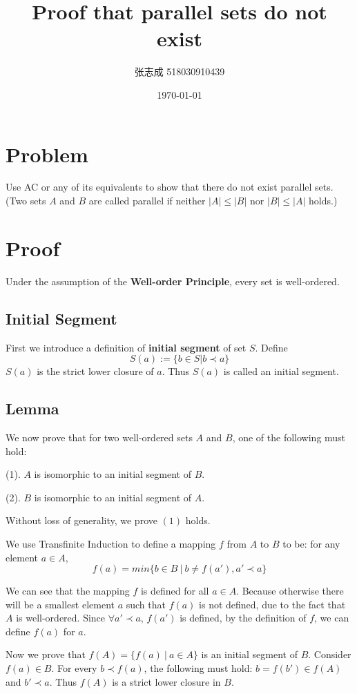 \documentclass[UTF8, 12pt]{ctexart}
\title{Proof that parallel sets do not exist}
\author{张志成 518030910439}
\date{\today}
\begin{document}
    \maketitle

    \section{Problem}
        Use AC or any of its equivalents to show that there do not exist parallel sets.
        (Two sets $A$ and $B$ are called parallel if neither $|A| \leq |B|$ nor $|B| \leq |A|$ holds.)
    \section{Proof}
        Under the assumption of the \textbf{Well-order Principle}, every set is well-ordered.
    \subsection{Initial Segment}
        First we introduce a definition of \textbf{initial segment} of set $S$.
        Define
        $$ S(a) := \{b \in S | b \prec a \} $$ 
        $S(a)$ is the strict lower closure of $a$. Thus $S(a)$ is called an initial segment.
    \subsection{Lemma}
        We now prove that for two well-ordered sets $A$ and $B$, one of the following must hold:
        
        (1). $A$ is isomorphic to an initial segment of $B$.

        (2). $B$ is isomorphic to an initial segment of $A$.

        Without loss of generality, we prove $(1)$ holds. \par
        We use Transfinite Induction to define a mapping $f$ from $A$ to $B$ to be:
        for any element $a \in A$, $$ f(a) = min\{b \in B\ |\ b \neq f(a'), a' \prec a \}$$

        We can see that the mapping $f$ is defined for all $a \in A$. Because otherwise there will be a smallest element $a$
        such that $f(a)$ is not defined, due to the fact that $A$ is well-ordered. Since $\forall a' \prec a$, $f(a')$ is defined,
        by the definition of $f$, we can define $f(a)$ for $a$. 

        Now we prove that $f(A) = \{f(a)\ |\ a \in A\}$ is an initial segment of $B$.
        Consider $f(a) \in B$. For every $b \prec f(a)$, the following must hold: $b = f(b') \in f(A)$ and $b' \prec a$.
        Thus $f(A)$ is a strict lower closure in $B$.
        
\end{document}
